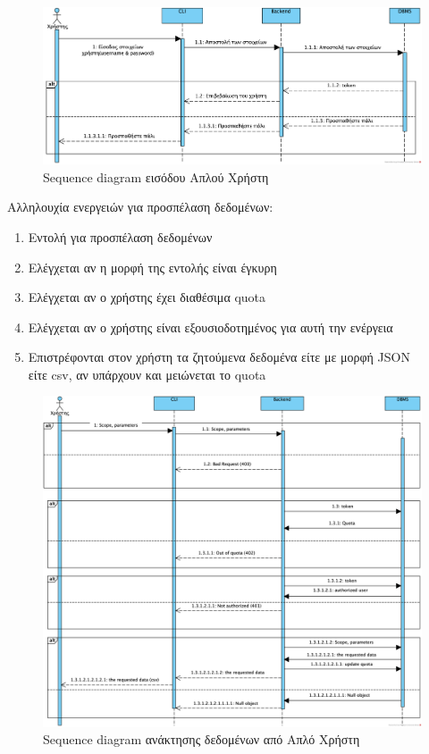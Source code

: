 \documentclass[a4paper,12pt, oneside]{article}
\begin{document}
\begin{figure}[h]
\includegraphics[width=1\textwidth]{./UML/Sequence_Diagram_User_Login.png}
\caption{\textlatin{Sequence diagram} εισόδου Απλού Χρήστη}
\centering
\end{figure}

Αλληλουχία ενεργειών για προσπέλαση δεδομένων: \\
\begin{enumerate}
	\item Εντολή για προσπέλαση δεδομένων
	\item Ελέγχεται αν η μορφή της εντολής είναι έγκυρη
	\item Ελέγχεται αν ο χρήστης έχει διαθέσιμα \textlatin{quota}
	\item Ελέγχεται αν ο χρήστης είναι εξουσιοδοτημένος για αυτή την ενέργεια
	\item Επιστρέφονται στον χρήστη τα ζητούμενα δεδομένα είτε με μορφή \textlatin{JSON} \\είτε \textlatin{csv}, αν υπάρχουν και μειώνεται το \textlatin{quota}
\end{enumerate} 
\clearpage

\begin{figure}[h]
\includegraphics[width=1\textwidth]{./UML/Sequence_Diagram_User_get_data.png}
\caption{\textlatin{Sequence diagram} ανάκτησης δεδομένων από Απλό Χρήστη}
\centering
\end{figure}
\end{document}
